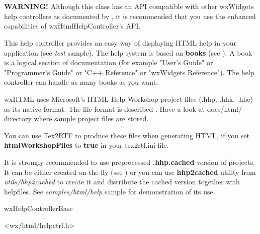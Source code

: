 %
%

\section{}\label{wxhtmlhelpcontroller}

{\bf WARNING!} Although this class has an API compatible with other wxWidgets
help controllers as documented by , it
is recommended that you use the enhanced capabilities of wxHtmlHelpController's API.

This help controller provides an easy way of displaying HTML help in your
application (see {\it test} sample). The help system is based on {\bf books} 
(see ). A book is a logical
section of documentation (for example "User's Guide" or "Programmer's Guide" or
"C++ Reference" or "wxWidgets Reference"). The help controller can handle as
many books as you want.

wxHTML uses Microsoft's HTML Help Workshop project files (.hhp, .hhk, .hhc) as its
native format. The file format is described .
Have a look at docs/html/ directory where sample project files are stored.

You can use Tex2RTF to produce these files when generating HTML, if you set {\bf htmlWorkshopFiles} to {\bf true} in
your tex2rtf.ini file.


It is strongly recommended to use preprocessed {\bf .hhp.cached} version of
projects. It can be either created on-the-fly (see 
) or you can use 
{\bf hhp2cached} utility from {\it utils/hhp2cached} to create it and
distribute the cached version together with helpfiles. See {\it samples/html/help} 
sample for demonstration of its use.




wxHelpControllerBase


<wx/html/helpctrl.h>


\label{wxhtmlhelpcontrollerwxhtmlhelpcontroller}

